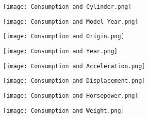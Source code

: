 \documentclass[12pt]{article}
\begin{document}
\begin{minipage}{\textwidth}
    \begin{minipage}[h]{0.5\linewidth}
        \centering
        \texttt{[image: Consumption and Cylinder.png]}
        \label{a}
    \end{minipage}
    \begin{minipage}[h]{0.5\linewidth}
        \centering
        \texttt{[image: Consumption and Model Year.png]}
        \label{b}   
    \end{minipage}
\end{minipage}

\begin{minipage}{\textwidth}
    \begin{minipage}[h]{0.5\linewidth}
        \centering
        \texttt{[image: Consumption and Origin.png]}
        \label{a}
    \end{minipage}
    \begin{minipage}[h]{0.5\linewidth}
        \centering
        \texttt{[image: Consumption and Year.png]}
        \label{b}   
    \end{minipage}
\end{minipage}

\begin{minipage}{\textwidth}
    \begin{minipage}[h]{0.5\linewidth}
        \centering
        \texttt{[image: Consumption and Acceleration.png]}
        \label{a}
    \end{minipage}
    \begin{minipage}[h]{0.5\linewidth}
        \centering
        \texttt{[image: Consumption and Displacement.png]}
        \label{b}   
    \end{minipage}
\end{minipage}

\begin{minipage}{\textwidth}
    \begin{minipage}[h]{0.5\linewidth}
        \centering
        \texttt{[image: Consumption and Horsepower.png]}
        \label{a}
    \end{minipage}
    \begin{minipage}[h]{0.5\linewidth}
        \centering
        \texttt{[image: Consumption and Weight.png]}
        \label{b}   
    \end{minipage}
\end{minipage}
\end{document}
